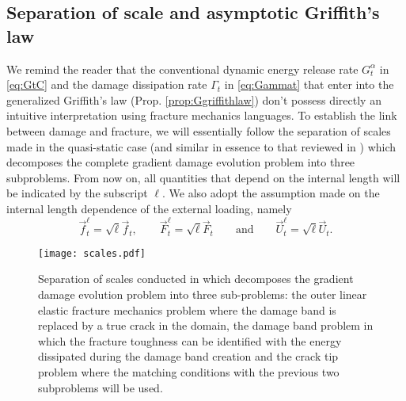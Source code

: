 \subsection{Separation of scale and asymptotic Griffith's law} \label{sec:asymptotic}
We remind the reader that the conventional dynamic energy release rate $G^\alpha_t$ in \eqref{eq:GtC} and the damage dissipation rate $\Gamma_t$ in \eqref{eq:Gammat} that enter into the generalized Griffith's law (Prop. \ref{prop:Ggriffithlaw}) don't possess directly an intuitive interpretation using fracture mechanics languages. To establish the link between damage and fracture, we will essentially follow the separation of scales made in the quasi-static case \cite{SicsicMarigo:2013} (and similar in essence to that reviewed in \cite{HakimKarma:2009}) which decomposes the complete gradient damage evolution problem into three subproblems. From now on, all quantities that depend on the internal length will be indicated by the subscript $\ell$. We also adopt the assumption made on the internal length dependence of the external loading, namely
\begin{equation} \label{eq:loadingell}
\vec{f}_t^\ell=\sqrt{\ell}\vec{f}_t,\qquad\vec{F}_t^\ell=\sqrt{\ell}\vec{F}_t\qquad\text{and}\qquad\vec{U}_t^\ell=\sqrt{\ell}\vec{U}_t.
\end{equation}
\begin{figure}[htbp]
\centering
\texttt{[image: scales.pdf]}
\caption{Separation of scales conducted in \cite{SicsicMarigo:2013} which decomposes the gradient damage evolution problem into three sub-problems: the outer linear elastic fracture mechanics problem where the damage band is replaced by a true crack in the domain, the damage band problem in which the fracture toughness can be identified with the energy dissipated during the damage band creation and the crack tip problem where the matching conditions with the previous two subproblems will be used.}
\end{figure}


